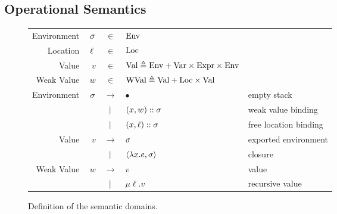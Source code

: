 \documentclass{article}
\begin{document}
\subsection{Operational Semantics}
\begin{figure}[h!]
  \centering
  \begin{tabular}{rrcll}
    Environment & $\sigma$ & $\in$         & $\text{Env}$                                                                        \\
    Location    & $\ell$ & $\in$         & $\text{Loc}$                                                                        \\
    Value       & $v$    & $\in$         & $\text{Val} \triangleq\text{Env}+\text{Var}\times\text{Expr}\times\text{Env}$                         \\
    Weak Value  & $w$    & $\in$         & $\text{WVal}\triangleq\text{Val}+\text{Loc}\times\text{Val}$                                     \\
    Environment & $\sigma$ & $\rightarrow$ & $\bullet$                                             & empty stack           \\
                &        & $|$       & $(x,w):: \sigma$                                     & weak value binding    \\
                &        & $|$       & $(x,\ell)::\sigma$                                   & free location binding \\
    Value       & $v$    & $\rightarrow$ & $\sigma$                                                & exported environment  \\
                &        & $|$       & $\langle \lambda x.e, \sigma \rangle$                   & closure               \\
    Weak Value  & $w$    & $\rightarrow$ & $v$                                                   & value                 \\
                &        & $|$       & $\mu\ell.v$                                           & recursive value
  \end{tabular}
  \caption{Definition of the semantic domains.}
  \label{fig:domain}
\end{figure}
\end{document}
